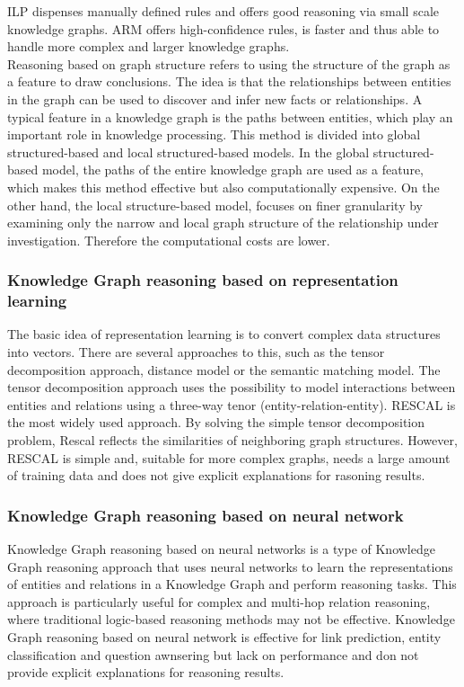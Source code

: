 \documentclass[
  a4paper,  %
  twoside,  %
  bibliography=totoc,
  headsepline,
  cleardoublepage=empty,
  parskip=half,
  draft=false
]{scrbook}
\begin{document}
\acrshort{ILP} dispenses manually defined rules and offers good reasoning via small scale knowledge graphs. \acrshort{ARM} offers high-confidence rules, is faster and thus able to handle more complex and larger knowledge graphs.\\
Reasoning based on graph structure refers to using the structure of the graph as a feature to draw conclusions. The idea is that the relationships between entities in the graph can be used to discover and infer new facts or relationships. A typical feature in a knowledge graph is the paths between entities, which play an important role in knowledge processing. This method is divided into global structured-based and local structured-based models. In the global structured-based model, the paths of the entire knowledge graph are used as a feature, which makes this method effective but also computationally expensive. On the other hand, the local structure-based model, focuses on finer granularity by examining only the narrow and local graph structure of the relationship under investigation. Therefore the computational costs are lower. 

\subsubsection{Knowledge Graph reasoning based on representation learning}
The basic idea of representation learning is to convert complex data structures into vectors. There are several approaches to this, such as the tensor decomposition approach, distance model or the semantic matching model. The tensor decomposition approach uses the possibility to model interactions between entities and relations using a three-way tenor (entity-relation-entity). \acrfull{RESCAL} is the most widely used approach. By solving the simple tensor decomposition problem, Rescal reflects the similarities of neighboring graph structures. However, \acrshort{RESCAL} is simple and, suitable for more complex graphs, needs a large amount of training data and does not give explicit explanations for rasoning results.\\

\subsubsection{Knowledge Graph reasoning based on neural network}
Knowledge Graph reasoning based on neural networks is a type of Knowledge Graph reasoning approach that uses neural networks to learn the representations of entities and relations in a Knowledge Graph and perform reasoning tasks. This approach is particularly useful for complex and multi-hop relation reasoning, where traditional logic-based reasoning methods may not be effective. Knowledge Graph reasoning based on neural network is effective for link prediction, entity classification and question awnsering but lack on performance and don not provide explicit explanations for reasoning results.
\end{document}
